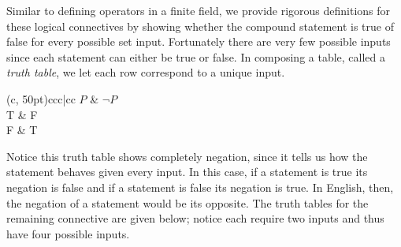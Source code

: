 Similar to defining operators in a finite field, we provide rigorous definitions for these logical connectives by showing whether the compound statement is true of false for every possible set input. Fortunately there are very few possible inputs since each statement can either be true or false. In composing a table, called a \emph{truth table}, we let each row correspond to a unique input.

\vspace{\baselineskip}
\begin{center}
	\begin{TAB}(c, 50pt){cc}{c|cc}
		$P$ & $\neg P$ \\
		T & F \\
		F & T \\
	\end{TAB}
\end{center}
\vspace{\baselineskip}

Notice this truth table shows completely negation, since it tells us how the statement behaves given every input. In this case, if a statement is true its negation is false and if a statement is false its negation is true. In English, then, the negation of a statement would be its opposite. The truth tables for the remaining connective are given below; notice each require two inputs and thus have four possible inputs.

